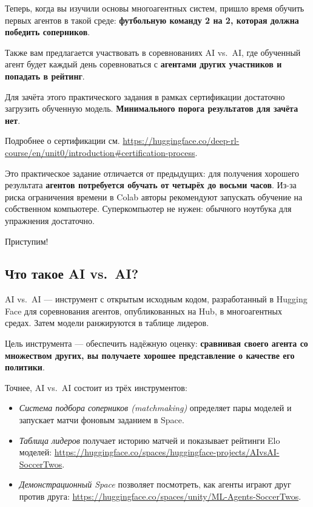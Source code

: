 \documentclass[11pt,a4paper]{article}
\begin{document}
Теперь, когда вы изучили основы многоагентных систем, пришло время обучить первых агентов в такой среде: \textbf{футбольную команду 2 на 2, которая должна победить соперников}.

Также вам предлагается участвовать в соревнованиях AI vs.~AI, где обученный агент будет каждый день соревноваться с \textbf{агентами других участников и попадать в рейтинг}.

Для зачёта этого практического задания в рамках сертификации достаточно загрузить обученную модель. \textbf{Минимального порога результатов для зачёта нет}.

Подробнее о сертификации см. \url{https://huggingface.co/deep-rl-course/en/unit0/introduction\#certification-process}.

Это практическое задание отличается от предыдущих: для получения хорошего результата \textbf{агентов потребуется обучать от четырёх до восьми часов}. Из-за риска ограничения времени в Colab авторы рекомендуют запускать обучение на собственном компьютере. Суперкомпьютер не нужен: обычного ноутбука для упражнения достаточно.

Приступим!

\subsection{Что такое AI vs.~AI?}\label{what-is-ai-vs.-ai}

AI vs.~AI --- инструмент с открытым исходным кодом, разработанный в Hugging Face для соревнования агентов, опубликованных на Hub, в многоагентных средах. Затем модели ранжируются в таблице лидеров.

Цель инструмента --- обеспечить надёжную оценку: \textbf{сравнивая своего агента со множеством других, вы получаете хорошее представление о качестве его политики}.

Точнее, AI vs.~AI состоит из трёх инструментов:

\begin{itemize}
\tightlist
\item
  \emph{Система подбора соперников (matchmaking)} определяет пары моделей и запускает матчи фоновым заданием в Space.
\item
  \emph{Таблица лидеров} получает историю матчей и показывает рейтинги Elo моделей: \url{https://huggingface.co/spaces/huggingface-projects/AIvsAI-SoccerTwos}.
\item
  \emph{Демонстрационный Space} позволяет посмотреть, как агенты играют друг против друга: \url{https://huggingface.co/spaces/unity/ML-Agents-SoccerTwos}.
\end{itemize}
\end{document}
